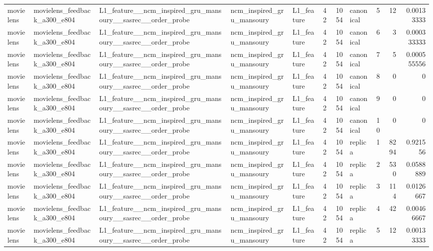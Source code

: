 \begin{table}[htbp!]
\begin{tabular}{lllllrrlrrr}
movielens & movielens\_feedback\_a300\_e804 & L1\_feature\_\_ncm\_inspired\_gru\_mansoury\_\_sasrec\_\_order\_probe & ncm\_inspired\_gru\_mansoury & L1\_feature & 42 & 1054 & canonical & 5 & 12 & 0.00133333 \\
movielens & movielens\_feedback\_a300\_e804 & L1\_feature\_\_ncm\_inspired\_gru\_mansoury\_\_sasrec\_\_order\_probe & ncm\_inspired\_gru\_mansoury & L1\_feature & 42 & 1054 & canonical & 6 & 3 & 0.000333333 \\
movielens & movielens\_feedback\_a300\_e804 & L1\_feature\_\_ncm\_inspired\_gru\_mansoury\_\_sasrec\_\_order\_probe & ncm\_inspired\_gru\_mansoury & L1\_feature & 42 & 1054 & canonical & 7 & 5 & 0.000555556 \\
movielens & movielens\_feedback\_a300\_e804 & L1\_feature\_\_ncm\_inspired\_gru\_mansoury\_\_sasrec\_\_order\_probe & ncm\_inspired\_gru\_mansoury & L1\_feature & 42 & 1054 & canonical & 8 & 0 & 0 \\
movielens & movielens\_feedback\_a300\_e804 & L1\_feature\_\_ncm\_inspired\_gru\_mansoury\_\_sasrec\_\_order\_probe & ncm\_inspired\_gru\_mansoury & L1\_feature & 42 & 1054 & canonical & 9 & 0 & 0 \\
movielens & movielens\_feedback\_a300\_e804 & L1\_feature\_\_ncm\_inspired\_gru\_mansoury\_\_sasrec\_\_order\_probe & ncm\_inspired\_gru\_mansoury & L1\_feature & 42 & 1054 & canonical & 10 & 0 & 0 \\
movielens & movielens\_feedback\_a300\_e804 & L1\_feature\_\_ncm\_inspired\_gru\_mansoury\_\_sasrec\_\_order\_probe & ncm\_inspired\_gru\_mansoury & L1\_feature & 42 & 1054 & replica & 1 & 8294 & 0.921556 \\
movielens & movielens\_feedback\_a300\_e804 & L1\_feature\_\_ncm\_inspired\_gru\_mansoury\_\_sasrec\_\_order\_probe & ncm\_inspired\_gru\_mansoury & L1\_feature & 42 & 1054 & replica & 2 & 530 & 0.0588889 \\
movielens & movielens\_feedback\_a300\_e804 & L1\_feature\_\_ncm\_inspired\_gru\_mansoury\_\_sasrec\_\_order\_probe & ncm\_inspired\_gru\_mansoury & L1\_feature & 42 & 1054 & replica & 3 & 114 & 0.0126667 \\
movielens & movielens\_feedback\_a300\_e804 & L1\_feature\_\_ncm\_inspired\_gru\_mansoury\_\_sasrec\_\_order\_probe & ncm\_inspired\_gru\_mansoury & L1\_feature & 42 & 1054 & replica & 4 & 42 & 0.00466667 \\
movielens & movielens\_feedback\_a300\_e804 & L1\_feature\_\_ncm\_inspired\_gru\_mansoury\_\_sasrec\_\_order\_probe & ncm\_inspired\_gru\_mansoury & L1\_feature & 42 & 1054 & replica & 5 & 12 & 0.00133333 \\

\end{tabular}
\end{table}
